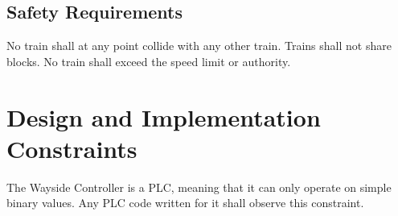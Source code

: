 \documentclass{scrreprt}
\begin{document}
\subsection{Safety Requirements}
No train shall at any point collide with any other train. Trains shall not share blocks. No train shall exceed
the speed limit or authority.

\section{Design and Implementation Constraints}
\begin{numonly}
    \item The Wayside Controller is a PLC, meaning that it can only operate on simple binary values. Any PLC code written for it shall observe this constraint.
\end{numonly}




\end{document}
